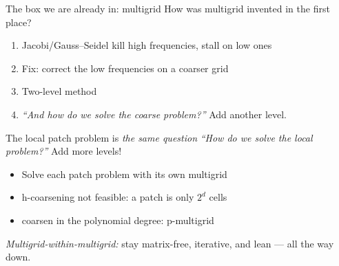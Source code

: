 \documentclass{beamer}
\begin{document}
\begin{frame}{The box we are already in: multigrid}
    How was multigrid invented in the first place?
    \begin{enumerate}
        \item Jacobi/Gauss--Seidel kill high frequencies, stall on low ones
        \item Fix: correct the low frequencies on a coarser grid
        \item Two-level method
        \item \emph{``And how do we solve the coarse problem?''} \quad
              \alert{Add another level.}
    \end{enumerate}
    \pause
    \vfill
    \begin{block}{The local patch problem is \emph{the same question}}
        \emph{``How do we solve the local problem?''} \pause\quad \alert{Add more levels!}
        \pause
        \begin{itemize}
            \item Solve each patch problem with its own multigrid
            \item h-coarsening not feasible: a patch is only $2^d$ cells
            \item coarsen in the polynomial degree: \alert{p-multigrid}
        \end{itemize}
    \end{block}
    \vfill
    \centering \emph{Multigrid-within-multigrid:} stay matrix-free, iterative, and lean --- all the way down.
\end{frame}
\end{document}
